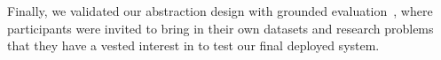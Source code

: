 {  \par Finally, we validated our abstraction design with grounded evaluation~\cite{Plaisant2004,Isenberg2008}, where participants were invited to bring in their own datasets and research problems that they have a vested interest in to test our final deployed system.%
  \par {}
}
